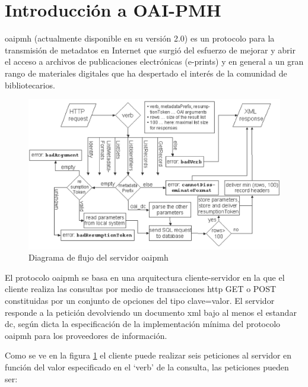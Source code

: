 \section{Introducción a OAI-PMH}\label{sec:oaipmh}

\acrfull{oaipmh} (actualmente disponible en su versión 2.0) es un protocolo para la transmisión de metadatos en Internet que surgió del esfuerzo de mejorar y abrir el acceso a archivos de publicaciones electrónicas (e-prints) y en general a un gran rango de materiales digitales que ha despertado el interés de la comunidad de bibliotecarios.\cite{JM_OAI}

\begin{figure}[!htp]
	\centering
	\includegraphics[scale=.15]{fig/oai_flow}
	\caption{Diagrama de flujo del servidor \acrshort{oaipmh}}\label{fig:oaiflow}
\end{figure}

El protocolo \acrshort{oaipmh} se basa en una arquitectura cliente-servidor en la que el cliente realiza las consultas por medio de transacciones \acrshort{http} GET o POST constituidas por un conjunto de opciones del tipo clave=valor. El servidor responde a la petición devolviendo un documento \acrshort{xml} bajo al menos el estandar \acrfull{dc}, según dicta la especificación de la implementación mínima del protocolo \acrshort{oaipmh} para los proveedores de información.\cite{OAIPMH_implementers}

Como se ve en la figura \ref{fig:oaiflow}\cite{oai_implementation} el cliente puede realizar seis peticiones al servidor en función del valor especificado en el `verb' de la consulta, las peticiones pueden ser:

